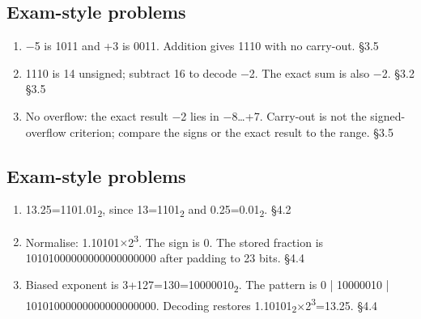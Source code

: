 \documentclass[11pt]{article}
\begin{document}
\begin{keepsection}\subsection{Exam-style problems}

\begin{enumerate}
\item \ensuremath{-}5 is 1011 and +3 is 0011. Addition gives 1110 with no carry-out. \hfill{\small\color{FAUblue}§3.5}
\item 1110 is 14 unsigned; subtract 16 to decode \ensuremath{-}2. The exact sum is also \ensuremath{-}2. \hfill{\small\color{FAUblue}§3.2} \hfill{\small\color{FAUblue}§3.5}
\item No overflow: the exact result \ensuremath{-}2 lies in \ensuremath{-}8…+7. Carry-out is not the signed-overflow criterion; compare the signs or the exact result to the range. \hfill{\small\color{FAUblue}§3.5}
\end{enumerate}

\end{keepsection}
\begin{keepsection}\subsection{Exam-style problems}

\begin{enumerate}
\item 13.25=1101.01\textsubscript{2}, since 13=1101\textsubscript{2} and 0.25=0.01\textsubscript{2}. \hfill{\small\color{FAUblue}§4.2}
\item Normalise: 1.10101\ensuremath{\times}2\textsuperscript{3}. The sign is 0. The stored fraction is 10101000000000000000000 after padding to 23 bits. \hfill{\small\color{FAUblue}§4.4}
\item Biased exponent is 3+127=130=10000010\textsubscript{2}. The pattern is 0 | 10000010 | 10101000000000000000000. Decoding restores 1.10101\textsubscript{2}\ensuremath{\times}2\textsuperscript{3}=13.25. \hfill{\small\color{FAUblue}§4.4}
\end{enumerate}

\end{keepsection}
\end{document}
